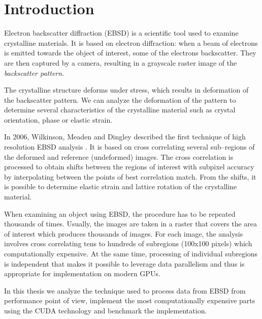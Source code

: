 \chapter*{Introduction}
Electron backscatter diffraction (EBSD) is a scientific tool used to examine crystalline materials. It is based on electron diffraction: when a beam of electrons is emitted towards the object of interest, some of the electrons backscatter. They are then captured by a camera, resulting in a grayscale raster image of the \emph{backscatter pattern}.

The crystalline structure deforms under stress, which results in deformation of the backscatter pattern. We can analyze the deformation of the pattern to determine several characteristics of the crystalline material such as crystal orientation, phase or elastic strain.

In 2006, Wilkinson, Meaden and Dingley described the first technique of high resolution EBSD analysis \cite{wilkinson2006high}. It is based on cross correlating several sub--regions of the deformed and reference (undeformed) images. The cross correlation is processed to obtain shifts between the regions of interest with subpixel accuracy by interpolating between the points of best correlation match. From the shifts, it is possible to determine elastic strain and lattice rotation of the crystalline material.

When examining an object using EBSD, the procedure has to be repeated thousands of times. Usually, the images are taken in a raster that covers the area of interest which produces thousands of images. For each image, the analysis involves cross correlating tens to hundreds of subregions (100x100 pixels) which computationally expensive. At the same time, processing of individual subregions is independent that makes it possible to leverage data parallelism and thus is appropriate for implementation on modern GPUs.

In this thesis we analyze the technique used to process data from EBSD from performance point of view, implement the most computationally expensive parts using the CUDA technology and benchmark the implementation. 
